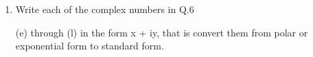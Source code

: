 \documentclass[12pt, a4paper]{report}
\theoremstyle{plain}
\theoremstyle{definition}
\theoremstyle{remark}
\begin{document}
\begin{enumerate}
\item Write each of the complex numbers in Q.6 
\item[(e)] through (l) in the form x + iy, that is
convert them from polar or exponential form to standard form.
\end{enumerate}
\end{document}
